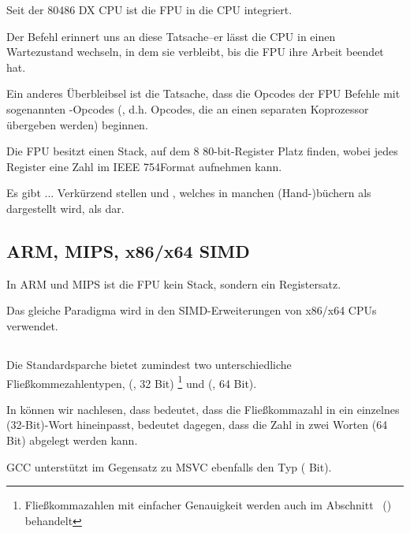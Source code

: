 Seit der 80486 DX CPU ist die \ac{FPU} in die \ac{CPU} integriert.

Der Befehl  erinnert uns an diese Tatsache--er lässt die \ac{CPU} in
einen Wartezustand wechseln, in dem sie verbleibt, bis die \ac{FPU} ihre Arbeit
beendet hat.

Ein anderes Überbleibsel ist die Tatsache, dass die Opcodes der \ac{FPU} Befehle
mit sogenannten -Opcodes (, d.h. Opcodes, die an einen
separaten Koprozessor übergeben werden) beginnen.

\label{FPU_is_stack}
Die FPU besitzt einen Stack, auf dem 8 80-bit-Register Platz finden, wobei jedes
Register eine Zahl im IEEE 754\FNURLIEEE Format aufnehmen kann.

Es gibt ... Verkürzend stellen \IDA und \olly {}, welches in
manchen (Hand-)büchern als  dargestellt wird, als  dar.

\subsection{ARM, MIPS, x86/x64 SIMD}
In ARM und MIPS ist die FPU kein Stack, sondern ein Registersatz.

Das gleiche Paradigma wird in den SIMD-Erweiterungen von x86/x64 CPUs verwendet.

\subsection{\CCpp}

Die Standardsparche \CCpp bietet zumindest two unterschiedliche
Fließkommezahlentypen, \Tfloat (\FNURLSP, 32 Bit)
\footnote{Fließkommazahlen mit einfacher Genauigkeit werden auch im Abschnitt
\IT{\WorkingWithFloatAsWithStructSubSubSectionName}~()
behandelt} und \Tdouble (\FNURLDP, 64 Bit).

In  können wir nachlesen, dass  bedeutet, dass die Fließkommazahl in ein einzelnes (32-Bit)-Wort
hineinpasst,  bedeutet dagegen, dass die Zahl in zwei
Worten (64 Bit) abgelegt werden kann.

GCC unterstützt im Gegensatz zu MSVC ebenfalls den  Typ
( Bit).

